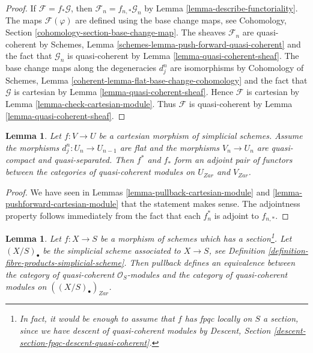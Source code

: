 \documentclass{stacks-project}
\theoremstyle{plain}
\newtheorem{lemma}[subsection]{Lemma}
\theoremstyle{definition}
\theoremstyle{remark}
\numberwithin{equation}{subsection}
\begin{document}
\begin{proof}
If $\mathcal{F} = f_* \mathcal{G}$, then
$\mathcal{F}_n = f_{n , *}\mathcal{G}_n$ by
Lemma \ref{lemma-describe-functoriality}.
The maps $\mathcal{F}(\varphi)$ are defined using the base change maps, see
Cohomology, Section \ref{cohomology-section-base-change-map}.
The sheaves $\mathcal{F}_n$ are quasi-coherent by
Schemes, Lemma \ref{schemes-lemma-push-forward-quasi-coherent}
and the fact that $\mathcal{G}_n$ is quasi-coherent
by Lemma \ref{lemma-quasi-coherent-sheaf}.
The base change maps along the degeneracies
$d^n_j$ are isomorphisms by Cohomology of Schemes, Lemma
\ref{coherent-lemma-flat-base-change-cohomology}
and the fact that $\mathcal{G}$ is cartesian
by Lemma \ref{lemma-quasi-coherent-sheaf}.
Hence $\mathcal{F}$ is cartesian by
Lemma \ref{lemma-check-cartesian-module}.
Thus $\mathcal{F}$ is quasi-coherent by
Lemma \ref{lemma-quasi-coherent-sheaf}.
\end{proof}

\begin{lemma}
\label{lemma-adjoint-functors-cartesian-modules}
Let $f : V \to U$ be a cartesian morphism of
simplicial schemes. Assume the morphisms $d^n_j : U_n \to U_{n - 1}$ are
flat and the morphisms $V_n \to U_n$ are quasi-compact and quasi-separated.
Then $f^*$ and $f_*$ form an adjoint pair of functors
between the categories of quasi-coherent modules on $U_{Zar}$ and $V_{Zar}$.
\end{lemma}

\begin{proof}
We have seen in Lemmas \ref{lemma-pullback-cartesian-module} and
\ref{lemma-pushforward-cartesian-module}
that the statement makes sense. The adjointness property follows
immediately from the fact that each $f_n^*$ is adjoint to $f_{n, *}$.
\end{proof}

\begin{lemma}
\label{lemma-cartesian-modules-with-section}
Let $f : X \to S$ be a morphism of schemes which has a
section\footnote{In fact, it would be enough to assume that $f$
has fpqc locally on $S$ a section, since we have descent of
quasi-coherent modules by Descent,
Section \ref{descent-section-fpqc-descent-quasi-coherent}.}.
Let $(X/S)_\bullet$ be the simplicial
scheme associated to $X \to S$, see
Definition \ref{definition-fibre-products-simplicial-scheme}.
Then pullback defines an equivalence between the category of
quasi-coherent $\mathcal{O}_S$-modules and the category of
quasi-coherent modules on $((X/S)_\bullet)_{Zar}$.
\end{lemma}
\end{document}
